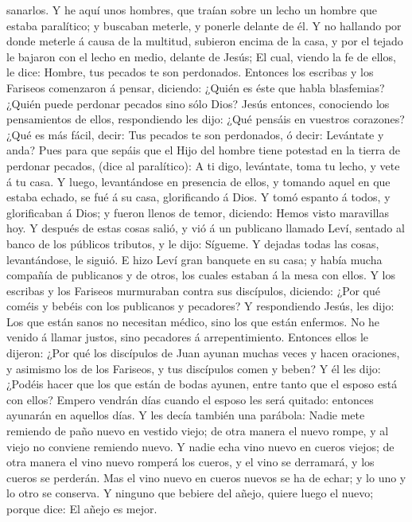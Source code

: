 sanarlos.  Y he aquí unos hombres, que traían sobre un
lecho un hombre que estaba paralítico; y buscaban meterle, y ponerle
delante de él.  Y no hallando por donde meterle á causa
de la multitud, subieron encima de la casa, y por el tejado le bajaron
con el lecho en medio, delante de Jesús;  El cual, viendo
la fe de ellos, le dice: Hombre, tus pecados te son perdonados.
 Entonces los escribas y los Fariseos comenzaron á
pensar, diciendo: ¿Quién es éste que habla blasfemias? ¿Quién puede
perdonar pecados sino sólo Dios?  Jesús entonces,
conociendo los pensamientos de ellos, respondiendo les dijo: ¿Qué
pensáis en vuestros corazones?  ¿Qué es más fácil, decir:
Tus pecados te son perdonados, ó decir: Levántate y anda?
 Pues para que sepáis que el Hijo del hombre tiene
potestad en la tierra de perdonar pecados, (dice al paralítico): A ti
digo, levántate, toma tu lecho, y vete á tu casa.  Y
luego, levantándose en presencia de ellos, y tomando aquel en que estaba
echado, se fué á su casa, glorificando á Dios.  Y tomó
espanto á todos, y glorificaban á Dios; y fueron llenos de temor,
diciendo: Hemos visto maravillas hoy.  Y después de estas
cosas salió, y vió á un publicano llamado Leví, sentado al banco de los
públicos tributos, y le dijo: Sígueme.  Y dejadas todas
las cosas, levantándose, le siguió.  E hizo Leví gran
banquete en su casa; y había mucha compañía de publicanos y de otros,
los cuales estaban á la mesa con ellos.  Y los escribas y
los Fariseos murmuraban contra sus discípulos, diciendo: ¿Por qué coméis
y bebéis con los publicanos y pecadores?  Y respondiendo
Jesús, les dijo: Los que están sanos no necesitan médico, sino los que
están enfermos.  No he venido á llamar justos, sino
pecadores á arrepentimiento.  Entonces ellos le dijeron:
¿Por qué los discípulos de Juan ayunan muchas veces y hacen oraciones, y
asimismo los de los Fariseos, y tus discípulos comen y beben?
 Y él les dijo: ¿Podéis hacer que los que están de bodas
ayunen, entre tanto que el esposo está con ellos?  Empero
vendrán días cuando el esposo les será quitado: entonces ayunarán en
aquellos días.  Y les decía también una parábola: Nadie
mete remiendo de paño nuevo en vestido viejo; de otra manera el nuevo
rompe, y al viejo no conviene remiendo nuevo.  Y nadie
echa vino nuevo en cueros viejos; de otra manera el vino nuevo romperá
los cueros, y el vino se derramará, y los cueros se perderán.
 Mas el vino nuevo en cueros nuevos se ha de echar; y lo
uno y lo otro se conserva.  Y ninguno que bebiere del
añejo, quiere luego el nuevo; porque dice: El añejo es mejor.

